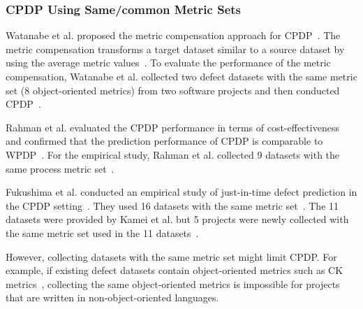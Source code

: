   
\subsubsection{CPDP Using Same/common Metric Sets}
Watanabe et al. proposed the metric compensation approach for
CPDP~\cite{Watanabe08}. The metric compensation transforms a target dataset
similar to a source dataset by using the average metric
values~\cite{Watanabe08}.
To evaluate the performance of the metric compensation, Watanabe et al. collected
two defect datasets with the same metric set (8 object-oriented
metrics) from two software projects and then conducted
CPDP~\cite{Watanabe08}.

Rahman et al. evaluated the CPDP performance in terms of
cost-effectiveness and confirmed that the prediction performance of CPDP is
comparable to WPDP~\cite{Rahman12}. For the empirical study, Rahman et al.
collected 9 datasets with the same process metric set~\cite{Rahman12}.

Fukushima et al. conducted an empirical study of just-in-time defect prediction
in the CPDP setting~\cite{Fukushima14}. They used 16
datasets with the same metric set~\cite{Fukushima14}. The 11 datasets were
provided by Kamei et al. but 5 projects were newly collected with the same metric
set used in the 11 datasets~\cite{Fukushima14,Kamei13}.

However, collecting datasets with the
same metric set might limit CPDP. For example, if
existing defect datasets contain object-oriented metrics such as CK
metrics~\cite{Basili96}, collecting the same object-oriented metrics is
impossible for projects that are written in non-object-oriented languages.

